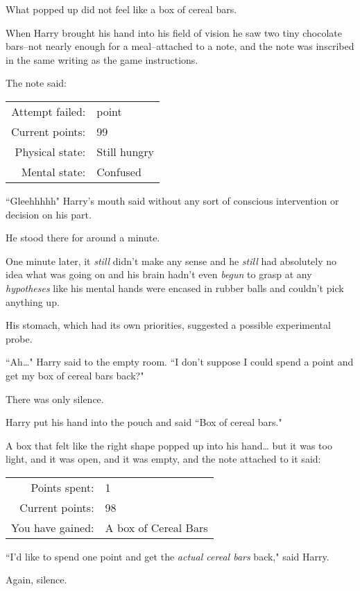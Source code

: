 What popped up did not feel like a box of cereal bars.

When Harry brought his hand into his field of vision he saw two tiny chocolate bars\---not nearly enough for a meal\---attached to a note, and the note was inscribed in the same writing as the game instructions.

The note said:
\begin{writtenNote}
\begin{tabular}{rl}
Attempt failed: & \minus1 point\\
Current points: & 99\\
Physical state: & Still hungry\\
Mental state: & Confused
\end{tabular}
\end{writtenNote}

``Gleehhhhh" Harry's mouth said without any sort of conscious intervention or decision on his part.

He stood there for around a minute.

One minute later, it \emph{still} didn't make any sense and he \emph{still} had absolutely no idea what was going on and his brain hadn't even \emph{begun} to grasp at any \emph{hypotheses} like his mental hands were encased in rubber balls and couldn't pick anything up.

His stomach, which had its own priorities, suggested a possible experimental probe.

``Ah{\ldots}" Harry said to the empty room. ``I don't suppose I could spend a point and get my box of cereal bars back?"

There was only silence.

Harry put his hand into the pouch and said ``Box of cereal bars."

A box that felt like the right shape popped up into his hand{\ldots} but it was too light, and it was open, and it was empty, and the note attached to it said:
\begin{writtenNote}
\begin{tabular}{rl}
Points spent: & 1\\
Current points: & 98\\
You have gained: & A box of Cereal Bars
\end{tabular}
\end{writtenNote}

``I'd like to spend one point and get the \emph{actual cereal bars} back," said Harry.

Again, silence.

